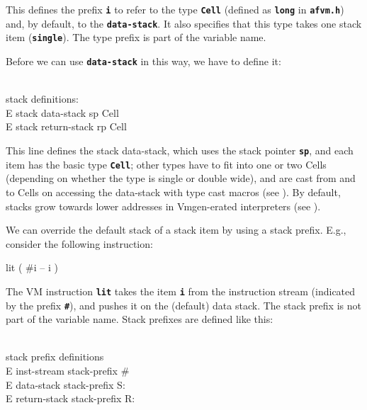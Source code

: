 \documentclass[10pt,english]{article}
\begin{document}
This defines the prefix \texttt{\textbf{i}} to refer to the type \texttt{\textbf{Cell}}
(defined as \texttt{\textbf{long}} in \texttt{\textbf{afvm.h}}) and,
by default, to the \texttt{\textbf{data-stack}}. It also specifies
that this type takes one stack item (\texttt{\textbf{single}}). The
type prefix is part of the variable name.

Before we can use \texttt{\textbf{data-stack}} in this way, we have
to define it:

\nwenddocs{}\endmoddef
\\ stack definitions:
\\E stack data-stack sp Cell
\\E stack return-stack rp Cell
\nwendcode{}\nwdocspar

This line defines the stack data-stack, which uses the stack pointer
\texttt{\textbf{sp}}, and each item has the basic type \texttt{\textbf{Cell}};
other types have to fit into one or two Cells (depending on whether
the type is single or double wide), and are cast from and to Cells
on accessing the data-stack with type cast macros (see ).
By default, stacks grow towards lower addresses in Vmgen-erated interpreters
(see ).

We can override the default stack of a stack item by using a stack
prefix. E.g., consider the following instruction:

\nwenddocs{}\endmoddef
lit ( #i -- i )
\nwendcode{}\nwdocspar

The VM instruction \texttt{\textbf{lit}} takes the item \texttt{\textbf{i}}
from the instruction stream (indicated by the prefix \texttt{\textbf{\#}}),
and pushes it on the (default) data stack. The stack prefix is not
part of the variable name. Stack prefixes are defined like this:

\nwenddocs{}\endmoddef
\\ stack prefix definitions
\\E inst-stream  stack-prefix #
\\E data-stack   stack-prefix S:
\\E return-stack stack-prefix R:
\nwendcode{}\nwdocspar
\end{document}
